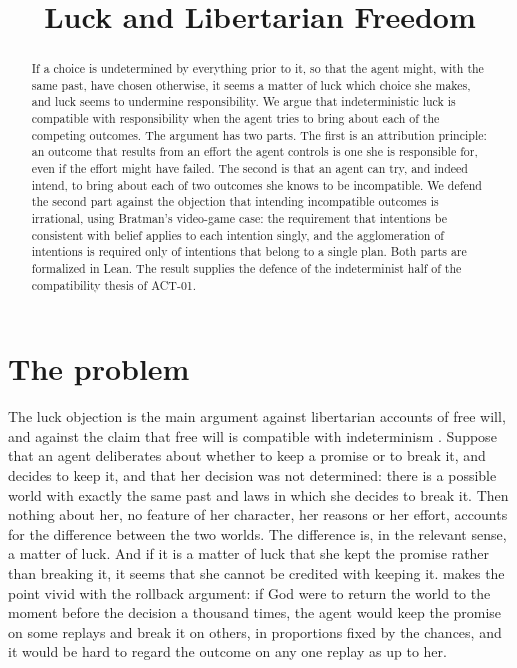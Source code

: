\documentclass{situationist-preprint}
\title{Luck and Libertarian Freedom}
\begin{document}
\maketitle

\begin{abstract}
If a choice is undetermined by everything prior to it, so that the agent might, with the same past, have chosen otherwise, it seems a matter of luck which choice she makes, and luck seems to undermine responsibility. We argue that indeterministic luck is compatible with responsibility when the agent tries to bring about each of the competing outcomes. The argument has two parts. The first is an attribution principle: an outcome that results from an effort the agent controls is one she is responsible for, even if the effort might have failed. The second is that an agent can try, and indeed intend, to bring about each of two outcomes she knows to be incompatible. We defend the second part against the objection that intending incompatible outcomes is irrational, using Bratman's video-game case: the requirement that intentions be consistent with belief applies to each intention singly, and the agglomeration of intentions is required only of intentions that belong to a single plan. Both parts are formalized in Lean. The result supplies the defence of the indeterminist half of the compatibility thesis of ACT-01.
\end{abstract}

\section{The problem}

The luck objection is the main argument against libertarian accounts of free will, and against the claim that free will is compatible with indeterminism \citep{Mele2006}. Suppose that an agent deliberates about whether to keep a promise or to break it, and decides to keep it, and that her decision was not determined: there is a possible world with exactly the same past and laws in which she decides to break it. Then nothing about her, no feature of her character, her reasons or her effort, accounts for the difference between the two worlds. The difference is, in the relevant sense, a matter of luck. And if it is a matter of luck that she kept the promise rather than breaking it, it seems that she cannot be credited with keeping it. \citet{vanInwagen2000} makes the point vivid with the rollback argument: if God were to return the world to the moment before the decision a thousand times, the agent would keep the promise on some replays and break it on others, in proportions fixed by the chances, and it would be hard to regard the outcome on any one replay as up to her.
\end{document}
